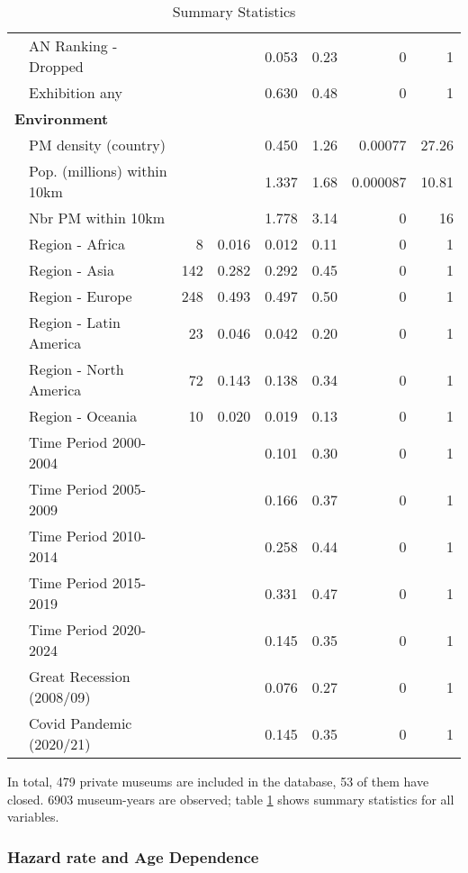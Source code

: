 \documentclass[12pt]{article}
\begin{document}
\begin{table}[ht]
\begin{tabular}{llrrrrrr}
   & AN Ranking - Dropped &  &  & 0.053 & 0.23 & 0 & 1 \\ 
   & Exhibition any &  &  & 0.630 & 0.48 & 0 & 1 \\ 
   \multicolumn{8}{l}{\textbf{Environment}} \\ 
 & PM density (country) &  &  & 0.450 & 1.26 & 0.00077 & 27.26 \\ 
   & Pop. (millions) within 10km &  &  & 1.337 & 1.68 & 0.000087 & 10.81 \\ 
   & Nbr PM within 10km &  &  & 1.778 & 3.14 & 0 & 16 \\ 
   & Region - Africa & 8 & 0.016 & 0.012 & 0.11 & 0 & 1 \\ 
   & Region - Asia & 142 & 0.282 & 0.292 & 0.45 & 0 & 1 \\ 
   & Region - Europe & 248 & 0.493 & 0.497 & 0.50 & 0 & 1 \\ 
   & Region - Latin America & 23 & 0.046 & 0.042 & 0.20 & 0 & 1 \\ 
   & Region - North America & 72 & 0.143 & 0.138 & 0.34 & 0 & 1 \\ 
   & Region - Oceania & 10 & 0.020 & 0.019 & 0.13 & 0 & 1 \\ 
   & Time Period 2000-2004 &  &  & 0.101 & 0.30 & 0 & 1 \\ 
   & Time Period 2005-2009 &  &  & 0.166 & 0.37 & 0 & 1 \\ 
   & Time Period 2010-2014 &  &  & 0.258 & 0.44 & 0 & 1 \\ 
   & Time Period 2015-2019 &  &  & 0.331 & 0.47 & 0 & 1 \\ 
   & Time Period 2020-2024 &  &  & 0.145 & 0.35 & 0 & 1 \\ 
   & Great Recession (2008/09) &  &  & 0.076 & 0.27 & 0 & 1 \\ 
   & Covid Pandemic (2020/21) &  &  & 0.145 & 0.35 & 0 & 1 \\ 
   \hline
\end{tabular}
\caption{Summary Statistics} 
\label{tbl:t_sumstats}
\end{table}

In total, 479 private museums are included in the database, 53 of them have closed.
6903 museum-years are observed; table \ref{tbl:t_sumstats} shows summary statistics for all variables.

\subsubsection*{Hazard rate and Age Dependence}
\end{document}
